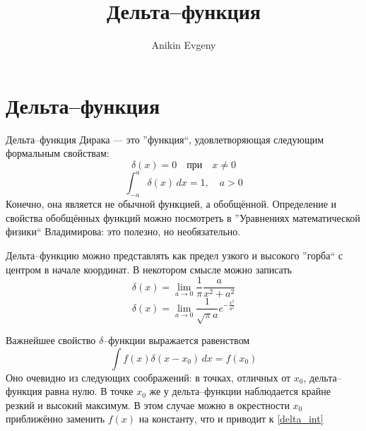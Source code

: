 \documentclass{article}
\title{Дельта--функция}
\author{Anikin Evgeny}
\begin{document}
\maketitle
\section{Дельта--функция}
Дельта--функция Дирака --- это ''функция``, удовлетворяющая следующим формальным 
свойствам:
\begin{equation}
    \delta(x) = 0 \quad \text{при} \quad x \ne 0
\end{equation}
\begin{equation}
    \int_{-a}^{a} \delta(x) \,dx = 1, \quad a > 0
\end{equation}
Конечно, она является не обычной функцией, а обобщённой. Определение и свойства обобщённых
функций можно посмотреть в ''Уравнениях математической физики`` Владимирова: это полезно,
но необязательно.

Дельта--функцию можно представлять как предел узкого и высокого ''горба`` с центром 
в начале координат. В некотором смысле можно записать
\begin{equation}
    \delta(x) = \lim_{a \to 0} \frac{1}{\pi} \frac{a}{x^2 + a^2}
\end{equation}
\begin{equation}
    \delta(x) = \lim_{a \to 0} \frac{1}{\sqrt{\pi}a} e^{-\frac{x^2}{a^2}}
\end{equation}

Важнейшее свойство $\delta$--функции выражается равенством
\begin{equation}
    \label{delta_int}
    \int f(x) \delta(x - x_0) \, dx = f(x_0)
\end{equation}
Оно очевидно из следующих соображений: в точках, отличных от $x_0$, дельта--функция равна
нулю. В точке $x_0$ же у дельта--функции наблюдается крайне резкий и высокий 
максимум. В этом случае можно в окрестности $x_0$ приближённо заменить $f(x)$ на константу,
что и приводит к \eqref{delta_int}
\end{document}
